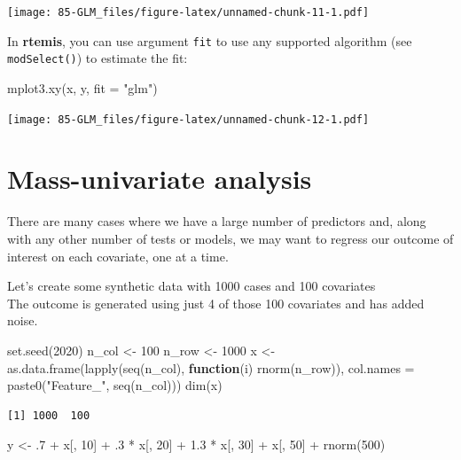\documentclass[
]{book}
\newenvironment{Shaded}{\begin{snugshade}}{\end{snugshade}}
\newcommand{\AttributeTok}[1]{\textcolor[rgb]{0.77,0.63,0.00}{#1}}
\newcommand{\ControlFlowTok}[1]{\textcolor[rgb]{0.13,0.29,0.53}{\textbf{#1}}}
\newcommand{\DecValTok}[1]{\textcolor[rgb]{0.00,0.00,0.81}{#1}}
\newcommand{\FloatTok}[1]{\textcolor[rgb]{0.00,0.00,0.81}{#1}}
\newcommand{\FunctionTok}[1]{\textcolor[rgb]{0.00,0.00,0.00}{#1}}
\newcommand{\NormalTok}[1]{#1}
\newcommand{\OtherTok}[1]{\textcolor[rgb]{0.56,0.35,0.01}{#1}}
\newcommand{\SpecialCharTok}[1]{\textcolor[rgb]{0.00,0.00,0.00}{#1}}
\newcommand{\StringTok}[1]{\textcolor[rgb]{0.31,0.60,0.02}{#1}}
\begin{document}
\texttt{[image: 85-GLM\_files/figure-latex/unnamed-chunk-11-1.pdf]}

In \textbf{rtemis}, you can use argument \texttt{fit} to use any supported algorithm (see \texttt{modSelect()}) to estimate the fit:

\begin{Shaded}
\begin{Highlighting}[]
\FunctionTok{mplot3.xy}\NormalTok{(x, y, }\AttributeTok{fit =} \StringTok{"glm"}\NormalTok{)}
\end{Highlighting}
\end{Shaded}

\texttt{[image: 85-GLM\_files/figure-latex/unnamed-chunk-12-1.pdf]}

\hypertarget{mass-univariate-analysis}{%
\section{Mass-univariate analysis}\label{mass-univariate-analysis}}

There are many cases where we have a large number of predictors and, along with any other number of tests or models, we may want to regress our outcome of interest on each covariate, one at a time.

Let's create some synthetic data with 1000 cases and 100 covariates\\
The outcome is generated using just 4 of those 100 covariates and has added noise.

\begin{Shaded}
\begin{Highlighting}[]
\FunctionTok{set.seed}\NormalTok{(}\DecValTok{2020}\NormalTok{)}
\NormalTok{n\_col }\OtherTok{\textless{}{-}} \DecValTok{100}
\NormalTok{n\_row }\OtherTok{\textless{}{-}} \DecValTok{1000}
\NormalTok{x }\OtherTok{\textless{}{-}} \FunctionTok{as.data.frame}\NormalTok{(}\FunctionTok{lapply}\NormalTok{(}\FunctionTok{seq}\NormalTok{(n\_col), }\ControlFlowTok{function}\NormalTok{(i) }\FunctionTok{rnorm}\NormalTok{(n\_row)),}
                   \AttributeTok{col.names =} \FunctionTok{paste0}\NormalTok{(}\StringTok{"Feature\_"}\NormalTok{, }\FunctionTok{seq}\NormalTok{(n\_col)))}
\FunctionTok{dim}\NormalTok{(x)}
\end{Highlighting}
\end{Shaded}

\begin{verbatim}
[1] 1000  100
\end{verbatim}

\begin{Shaded}
\begin{Highlighting}[]
\NormalTok{y }\OtherTok{\textless{}{-}}\NormalTok{ .}\DecValTok{7} \SpecialCharTok{+}\NormalTok{ x[, }\DecValTok{10}\NormalTok{] }\SpecialCharTok{+}\NormalTok{ .}\DecValTok{3} \SpecialCharTok{*}\NormalTok{ x[, }\DecValTok{20}\NormalTok{] }\SpecialCharTok{+} \FloatTok{1.3} \SpecialCharTok{*}\NormalTok{ x[, }\DecValTok{30}\NormalTok{] }\SpecialCharTok{+}\NormalTok{ x[, }\DecValTok{50}\NormalTok{] }\SpecialCharTok{+} \FunctionTok{rnorm}\NormalTok{(}\DecValTok{500}\NormalTok{)}
\end{Highlighting}
\end{Shaded}
\end{document}
